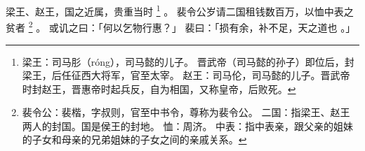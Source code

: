 
\switchcolumn*[\section{}]

梁王、赵王，国之近属，贵重当时%
\footnote{%
    梁王：司马肜（róng），司马懿的儿子。
          晋武帝（司马懿的孙子）即位后，封梁王，后任征西大将军，官至太宰。
    赵王：司马伦，司马懿的儿子。晋武帝时封赵王，晋惠帝时起兵反，自为相国，又称皇帝，后败死。
}%
。
裴令公岁请二国租钱数百万，以恤中表之贫者%
\footnote{%
    裴令公：裴楷，字叔则，官至中书令，尊称为裴令公。
    二国：指梁王、赵王两人的封国。国是侯王的封地。
    恤：周济。
    中表：指中表亲，跟父亲的姐妹的子女和母亲的兄弟姐妹的子女之间的亲戚关系。
}%
。
或讥之曰：「何以乞物行惠？」
裴曰：「损有余，补不足，天之道也 。」

\switchcolumn



